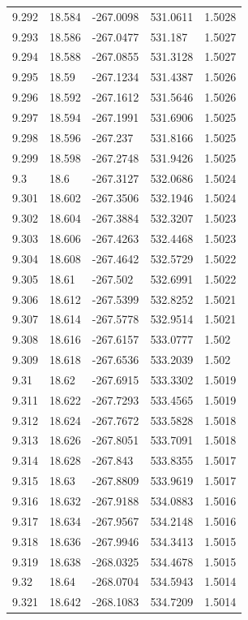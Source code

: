 \begin{tabular}{lllll}
9.292 & 18.584 & -267.0098 & 531.0611 & 1.5028 \\
9.293 & 18.586 & -267.0477 & 531.187 & 1.5027 \\
9.294 & 18.588 & -267.0855 & 531.3128 & 1.5027 \\
9.295 & 18.59 & -267.1234 & 531.4387 & 1.5026 \\
9.296 & 18.592 & -267.1612 & 531.5646 & 1.5026 \\
9.297 & 18.594 & -267.1991 & 531.6906 & 1.5025 \\
9.298 & 18.596 & -267.237 & 531.8166 & 1.5025 \\
9.299 & 18.598 & -267.2748 & 531.9426 & 1.5025 \\
9.3 & 18.6 & -267.3127 & 532.0686 & 1.5024 \\
9.301 & 18.602 & -267.3506 & 532.1946 & 1.5024 \\
9.302 & 18.604 & -267.3884 & 532.3207 & 1.5023 \\
9.303 & 18.606 & -267.4263 & 532.4468 & 1.5023 \\
9.304 & 18.608 & -267.4642 & 532.5729 & 1.5022 \\
9.305 & 18.61 & -267.502 & 532.6991 & 1.5022 \\
9.306 & 18.612 & -267.5399 & 532.8252 & 1.5021 \\
9.307 & 18.614 & -267.5778 & 532.9514 & 1.5021 \\
9.308 & 18.616 & -267.6157 & 533.0777 & 1.502 \\
9.309 & 18.618 & -267.6536 & 533.2039 & 1.502 \\
9.31 & 18.62 & -267.6915 & 533.3302 & 1.5019 \\
9.311 & 18.622 & -267.7293 & 533.4565 & 1.5019 \\
9.312 & 18.624 & -267.7672 & 533.5828 & 1.5018 \\
9.313 & 18.626 & -267.8051 & 533.7091 & 1.5018 \\
9.314 & 18.628 & -267.843 & 533.8355 & 1.5017 \\
9.315 & 18.63 & -267.8809 & 533.9619 & 1.5017 \\
9.316 & 18.632 & -267.9188 & 534.0883 & 1.5016 \\
9.317 & 18.634 & -267.9567 & 534.2148 & 1.5016 \\
9.318 & 18.636 & -267.9946 & 534.3413 & 1.5015 \\
9.319 & 18.638 & -268.0325 & 534.4678 & 1.5015 \\
9.32 & 18.64 & -268.0704 & 534.5943 & 1.5014 \\
9.321 & 18.642 & -268.1083 & 534.7209 & 1.5014 \\

\end{tabular}
